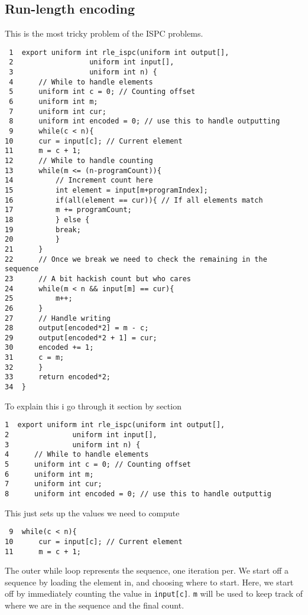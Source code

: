 \documentclass[11pt]{article}
\begin{document}
\subsection{Run-length encoding}
\label{sec:orgbbe8b2b}
This is the most tricky problem of the ISPC problems.

\begin{verbatim}
 1  export uniform int rle_ispc(uniform int output[],
 2  			    uniform int input[], 
 3  			    uniform int n) {
 4      // While to handle elements
 5      uniform int c = 0; // Counting offset
 6      uniform int m;
 7      uniform int cur;
 8      uniform int encoded = 0; // use this to handle outputting
 9      while(c < n){
10  	cur = input[c]; // Current element
11  	m = c + 1;
12  	// While to handle counting
13  	while(m <= (n-programCount)){
14  	    // Increment count here
15  	    int element = input[m+programIndex];
16  	    if(all(element == cur)){ // If all elements match
17  		m += programCount; 
18  	    } else {
19  		break;
20  	    }
21  	}
22  	// Once we break we need to check the remaining in the sequence
23  	// A bit hackish count but who cares
24  	while(m < n && input[m] == cur){
25  	    m++;
26  	}
27  	// Handle writing
28  	output[encoded*2] = m - c;
29  	output[encoded*2 + 1] = cur;
30  	encoded += 1;
31  	c = m;
32      }
33      return encoded*2;
34  }
\end{verbatim}

To explain this i go through it section by section
\begin{verbatim}
1  export uniform int rle_ispc(uniform int output[],
2  			    uniform int input[], 
3  			    uniform int n) {
4      // While to handle elements
5      uniform int c = 0; // Counting offset
6      uniform int m;
7      uniform int cur;
8      uniform int encoded = 0; // use this to handle outputtig
\end{verbatim}
This just sets up the values we need to compute

\begin{verbatim}
 9  while(c < n){
10      cur = input[c]; // Current element
11      m = c + 1;
\end{verbatim}
The outer while loop represents the sequence, one iteration per. We start off
a sequence by loading the element in, and choosing where to start. Here, we start
off by immediately counting the value in \texttt{input[c]}. \texttt{m} will be used to keep
track of where we are in the sequence and the final count.
\end{document}

